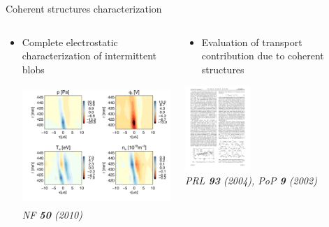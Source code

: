 \documentclass[t,10pt]{beamer}
\begin{document}
\begin{frame}{Coherent structures characterization}


\begin{columns}[t]
\begin{column}{0.5\textwidth}
\begin{itemize}
\item Complete electrostatic characterization of intermittent blobs
 
\begin{center}
\includegraphics[height=4.5cm]{2Dstructure}\\
{\tiny \textit{NF \textbf{50} (2010)}}
\end{center}
\end{itemize}
\end{column}
\pause
\begin{column}{0.5\textwidth}
\begin{itemize}
\item Evaluation of transport contribution due to coherent structures
\end{itemize}
\begin{center}
\includegraphics[height=3.2cm]{structure-diffusivity}\\
{\tiny \textit{PRL \textbf{93} (2004), PoP \textbf{9} (2002)}}
\end{center}
\end{column}
\end{columns}
\end{frame}
\end{document}
